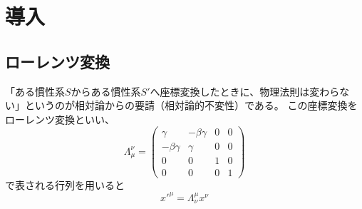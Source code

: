 
\chapter{導入}
\section{ローレンツ変換}
「ある慣性系$S$からある慣性系$S\prime$へ座標変換したときに、物理法則は変わらない」というのが相対論からの要請（相対論的不変性）である。
この座標変換をローレンツ変換といい、
\begin{equation}
  \Lambda_{\mu}^{\nu} = \left(
    \begin{array}{cccc}
      \gamma       & -\beta\gamma & 0 & 0 \\
      -\beta\gamma & \gamma       & 0 & 0 \\
      0            & 0            & 1 & 0 \\
      0            & 0            & 0 & 1
    \end{array}
  \right)
\end{equation}
で表される行列を用いると
\begin{equation}
  x\prime^{\mu} = \Lambda^\mu_\nu x^\nu
\end{equation}
